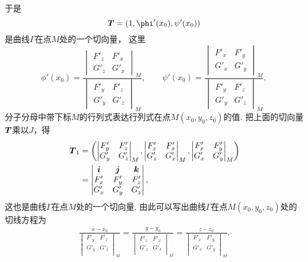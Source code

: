 于是\[
	\vb{T} = (1,\phi'(x_0),\psi'(x_0))
\]是曲线\(\Gamma\)在点\(M\)处的一个切向量，
这里\[
	\phi'(x_0)
	= \frac{
			\begin{vmatrix}
				F'_z & F'_x \\
				G'_z & G'_x
			\end{vmatrix}_M
		}{
			\begin{vmatrix}
				F'_y & F'_z \\
				G'_y & G'_z
			\end{vmatrix}_M
		},
	\qquad
	\psi'(x_0)
	= \frac{
			\begin{vmatrix}
				F'_x & F'_y \\
				G'_x & G'_y
			\end{vmatrix}_M
		}{
			\begin{vmatrix}
				F'_y & F'_z \\
				G'_y & G'_z
			\end{vmatrix}_M
		},
\]
分子分母中带下标\(M\)的行列式表达行列式在点\(M(x_0,y_0,z_0)\)的值.
把上面的切向量\(\boldsymbol{T}\)乘以\(J\)，得\begin{align*}
	\boldsymbol{T}_1
	&= \left(
		\begin{vmatrix}
			F'_y & F'_z \\
			G'_y & G'_z \\
		\end{vmatrix}_M,
		\begin{vmatrix}
			F'_z & F'_x \\
			G'_z & G'_x \\
		\end{vmatrix}_M,
		\begin{vmatrix}
			F'_x & F'_y \\
			G'_x & G'_y \\
		\end{vmatrix}_M
	\right) \\
	&= \begin{vmatrix}
		\boldsymbol{i} & \boldsymbol{j} & \boldsymbol{k} \\
		F'_x & F'_y & F'_z \\
		G'_x & G'_y & G'_z
	\end{vmatrix}
	,
\end{align*}
这也是曲线\(\Gamma\)在点\(M\)处的一个切向量.
由此可以写出曲线\(\Gamma\)在点\(M(x_0,y_0,z_0)\)处的切线方程为\begin{gather}
	\frac{x-x_0}{\begin{vmatrix}
		F'_y & F'_z \\
		G'_y & G'_z \\
	\end{vmatrix}_M}
	=\frac{y-y_0}{\begin{vmatrix}
		F'_z & F'_x \\
		G'_z & G'_x \\
	\end{vmatrix}_M}
	=\frac{z-z_0}{\begin{vmatrix}
		F'_x & F'_y \\
		G'_x & G'_y \\
	\end{vmatrix}_M}.
	\tag{13}
\end{gather}

